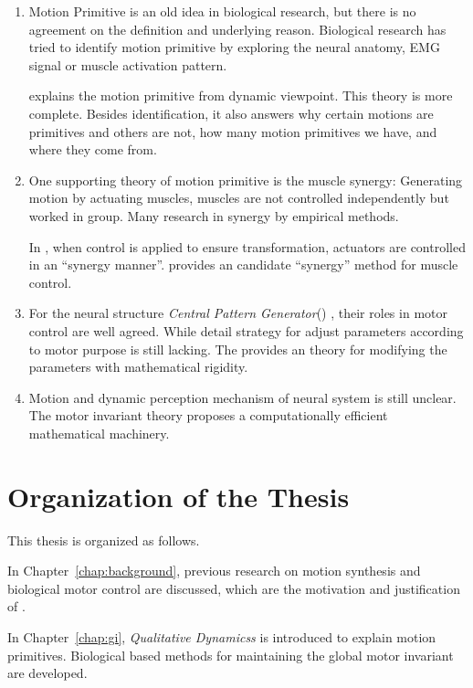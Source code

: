 \begin{enumerate}
\item 
Motion Primitive is an old idea in biological research, but there is no agreement on the definition and underlying reason.
Biological research has tried to identify motion primitive by exploring the neural anatomy, EMG signal or muscle activation pattern.

\moit  explains the motion primitive from dynamic viewpoint.
This theory is more complete.
Besides identification, it also answers why certain motions are primitives and others are not,
how many motion primitives we have,  and where they come from.

\item One supporting theory of motion primitive is the muscle synergy:
Generating motion by actuating muscles, muscles are not controlled independently but worked in group. 
Many research in synergy by empirical methods. 

In \moit, when control is applied to ensure transformation, actuators are controlled in an ``synergy manner''.
\moit provides an candidate  ``synergy'' method for muscle control.

\item For the neural structure \emph{Central Pattern Generator}(\cpg) , their roles in motor control are well agreed.
While detail strategy for adjust \cpg parameters according to motor purpose is still lacking.
The \moit provides an theory for modifying the \cpg parameters with mathematical rigidity.


\item  Motion and dynamic perception mechanism of neural system is still unclear.
The motor invariant theory proposes a computationally efficient mathematical machinery.
\end{enumerate}







\section{Organization of the Thesis}

This thesis is organized as follows.
 
In Chapter~\ref{chap:background}, previous research on motion synthesis and biological motor control are discussed, which are the motivation and justification of \moit.
 
In Chapter~\ref{chap:gi}, \emph{Qualitative Dynamicss} is introduced to explain motion primitives. 
Biological based  methods for maintaining the global motor invariant are developed.

